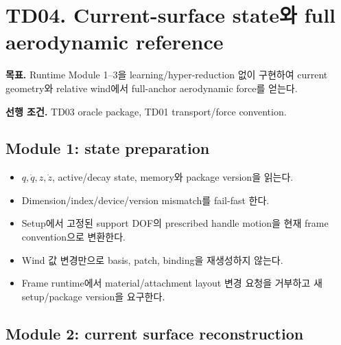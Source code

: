 \documentclass[10pt,a4paper]{article}
\newcommand{\todo}{\textcolor{TodoGray}{\(\square\)}}
\begin{document}
\section{TD04. Current-surface state와 full aerodynamic reference}

\textbf{목표.}
Runtime Module 1--3을 learning/hyper-reduction 없이 구현하여 current geometry와 relative wind에서 full-anchor aerodynamic force를 얻는다.

\textbf{선행 조건.} TD03 oracle package, TD01 transport/force convention.

\subsection*{Module 1: state preparation}

\begin{itemize}
  \item[\todo] \(q,\dot q,z,\dot z\), active/decay state, memory와 package version을 읽는다.
  \item[\todo] Dimension/index/device/version mismatch를 fail-fast 한다.
  \item[\todo] Setup에서 고정된 support DOF의 prescribed handle motion을 현재 frame convention으로 변환한다.
  \item[\todo] Wind 값 변경만으로 basis, patch, binding을 재생성하지 않는다.
  \item[\todo] Frame runtime에서 material/attachment layout 변경 요청을 거부하고 새 setup/package version을 요구한다.
\end{itemize}

\subsection*{Module 2: current surface reconstruction}
\end{document}
